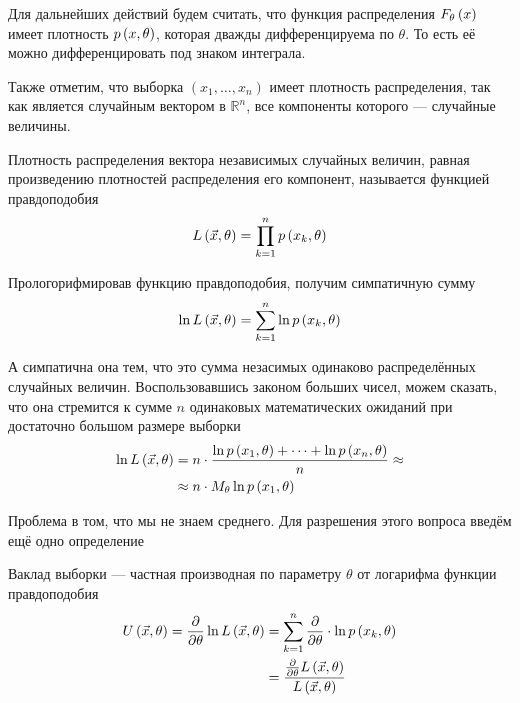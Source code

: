 Для дальнейших действий будем считать,
что функция распределения $F_{\theta}\left(x\right)$ имеет плотность $p\left(x,\theta\right)$,
которая дважды дифференцируема по $\theta$.
То есть её можно дифференцировать под знаком интеграла.

Также отметим, что выборка $\left( x_1, \dots, x_n \right)$
имеет плотность распределения,
так как является случайным вектором в $\mathbb{R}^n$,
все компоненты которого --- случайные величины.

\begin{definition}
    Плотность распределения вектора независимых случайных величин,
    равная произведению плотностей распределения его компонент,
    называется функцией правдоподобия
    $$L\left( \vec{x},\theta \right)=\prod_{k=1}^np\left(x_k,\theta\right)$$
\end{definition}

Прологорифмировав функцию правдоподобия, получим симпатичную сумму
$$\ln{L\left( \vec{x},\theta \right)}=\sum_{k=1}^n\ln{p\left(x_k,\theta\right)}$$

А симпатична она тем,
что это сумма незасимых одинаково распределённых случайных величин.
Воспользовавшись законом больших чисел, можем сказать,
что она стремится к сумме $n$ одинаковых математических ожиданий
при достаточно большом размере выборки
\begin{align*}
    \ln{L\left( \vec{x},\theta \right)}
        &=n\cdot\frac{\ln{p\left(x_1,\theta\right)}+\dots+\ln{p\left(x_n,\theta\right)}}
            {n}\approx\\
        &\approx n\cdot M_{\theta} \ln{p\left(x_1,\theta\right)}
\end{align*}

Проблема в том, что мы не знаем среднего.
Для разрешения этого вопроса введём ещё одно определение

\begin{definition}
    Ваклад выборки --- частная производная по параметру $\theta$
    от логарифма функции правдоподобия
    \begin{align*}
        U\left( \vec{x},\theta \right)
            =\frac{\partial}{\partial\theta}\ln{L\left(\vec{x},\theta\right)}
            &=\sum_{k=1}^n
                \frac{\partial}{\partial\theta}\cdot\ln{p\left(x_k,\theta\right)}\\
            &=\frac{\frac{\partial}{\partial\theta}L\left(\vec{x},\theta\right)}
                {L\left(\vec{x},\theta\right)}
    \end{align*}
\end{definition}

